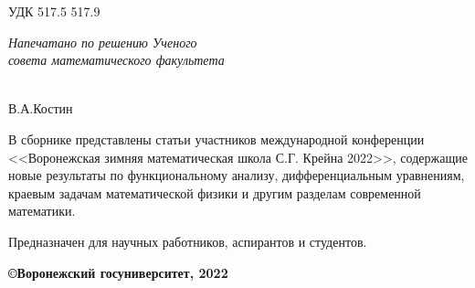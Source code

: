\noindent УДК 517.5 517.9

\begin{flushright}
{\it Напечатано по решению Ученого \\ совета математического
факультета \\
}
 \end{flushright}
\vspace{15mm}{\bf Материалы работы международной конференции
\\<<Воронежская зимняя математическая школа С.Г.
Крейна - 2022>>. Воронеж: ВГУ, 2022 - с.}

\vspace{5mm}

 \\
В.А.Костин

\vspace{5mm}


\vspace{15mm}

В сборнике представлены статьи участников международной конференции
\\
<<Воронежская зимняя математическая школа С.Г. Крейна 2022>>,
содержащие новые
результаты по функциональному анализу, дифференциальным уравнениям,
краевым задачам математической физики и другим разделам современной
математики.

Предназначен для научных работников, аспирантов и студентов.


\begin{flushright}
{\bf \copyright Воронежский госуниверситет, 2022}
\end{flushright}

\newpage
